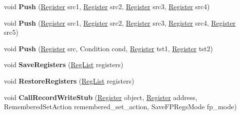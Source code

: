 \begin{DoxyCompactItemize}
\item 
\mbox{\label{classv8_1_1internal_1_1TurboAssembler_ad08de22655d23e3cb5cbcaeea8657f7a}} 
void {\bfseries Push} (\mbox{\hyperlink{classv8_1_1internal_1_1Register}{Register}} src1, \mbox{\hyperlink{classv8_1_1internal_1_1Register}{Register}} src2, \mbox{\hyperlink{classv8_1_1internal_1_1Register}{Register}} src3, \mbox{\hyperlink{classv8_1_1internal_1_1Register}{Register}} src4)
\item 
\mbox{\label{classv8_1_1internal_1_1TurboAssembler_a6121a116c8d45e9c5ba8868040423c89}} 
void {\bfseries Push} (\mbox{\hyperlink{classv8_1_1internal_1_1Register}{Register}} src1, \mbox{\hyperlink{classv8_1_1internal_1_1Register}{Register}} src2, \mbox{\hyperlink{classv8_1_1internal_1_1Register}{Register}} src3, \mbox{\hyperlink{classv8_1_1internal_1_1Register}{Register}} src4, \mbox{\hyperlink{classv8_1_1internal_1_1Register}{Register}} src5)
\item 
\mbox{\label{classv8_1_1internal_1_1TurboAssembler_ab60b041db3c4ce56d0cbf710d95f2a56}} 
void {\bfseries Push} (\mbox{\hyperlink{classv8_1_1internal_1_1Register}{Register}} src, Condition cond, \mbox{\hyperlink{classv8_1_1internal_1_1Register}{Register}} tst1, \mbox{\hyperlink{classv8_1_1internal_1_1Register}{Register}} tst2)
\item 
\mbox{\label{classv8_1_1internal_1_1TurboAssembler_adb2676d473b8bdff1c6856758eabfa71}} 
void {\bfseries Save\+Registers} (\mbox{\hyperlink{classuint32__t}{Reg\+List}} registers)
\item 
\mbox{\label{classv8_1_1internal_1_1TurboAssembler_a1ff5e6044d8b7223b66061f3ed4123f1}} 
void {\bfseries Restore\+Registers} (\mbox{\hyperlink{classuint32__t}{Reg\+List}} registers)
\item 
\mbox{\label{classv8_1_1internal_1_1TurboAssembler_ab10280acd4d7aebd053a430cbea68fb1}} 
void {\bfseries Call\+Record\+Write\+Stub} (\mbox{\hyperlink{classv8_1_1internal_1_1Register}{Register}} object, \mbox{\hyperlink{classv8_1_1internal_1_1Register}{Register}} address, Remembered\+Set\+Action remembered\+\_\+set\+\_\+action, Save\+F\+P\+Regs\+Mode fp\+\_\+mode)

\end{DoxyCompactItemize}
